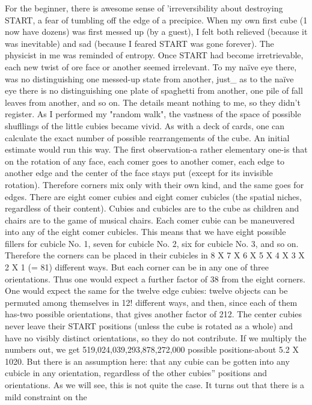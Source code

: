         For the beginner, there is awesome sense of 'irreversibility about destroying
START, a fear of tumbling off the edge of a precipice. When my own first cube (1
now have dozens) was first messed up (by a guest), I felt both relieved (because it was
inevitable) and sad (because I feared START was gone forever). The physicist in me
was reminded of entropy. Once START had become irretrievable, each new twist of
ore face or another seemed irrelevant. To my naïve eye there, was no distinguishing
one messed-up state from another, just\_ as to the naïve eye there is no distinguishing
one plate of spaghetti from another, one pile of fall leaves from another, and so on.
The details meant nothing to me, so they didn't register. As I performed my "random
walk", the vastness of the space of possible shufllings of the little cubies became
vivid.
        As with a deck of cards, one can calculate the exact number of possible
rearrangements of the cube. An initial estimate would run this way. The first
observation-a rather elementary one-is that on the rotation of any face, each comer
goes to another comer, each edge to another edge and the center of the face stays put
(except for its invisible rotation). Therefore corners mix only with their own kind, and
the same goes for edges. There are eight comer cubies and eight comer cubicles (the
spatial niches, regardless of their content). Cubies and cubicles are to the cube as
children and chairs are to the game of musical chairs. Each comer cubie can be
maneuvered into any of the eight comer cubicles. This means that we have eight
possible fillers for cubicle No. 1, seven for cubicle No. 2, six for cubicle No. 3, and so
on. Therefore the corners can be placed in their cubicles in 8 X 7 X 6 X 5 X 4 X 3 X 2
X 1 (= 81) different ways. But each corner can be in any one of three orientations.
Thus one would expect a further factor of 38 from the eight corners. One would
expect the same for the twelve edge cubies: twelve objects can be permuted among
themselves in 12! different ways, and then, since each of them has-two possible
orientations, that gives another factor of 212. The center cubies never leave their
START positions (unless the cube is rotated as a whole) and have no visibly distinct
orientations, so they do not contribute. If we multiply the numbers out, we get
519,024,039,293,878,272,000 possible positions-about 5.2 X 1020.
        But there is an assumption here: that any cubie can be gotten into any cubicle
in any orientation, regardless of the other cubies'' positions and orientations. As we
will see, this is not quite the case. It turns out that there is a mild constraint on the
